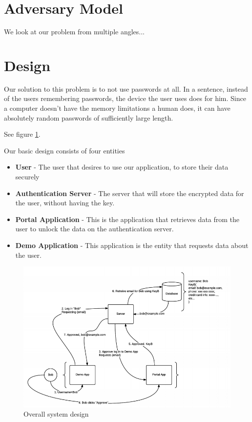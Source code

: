 \documentclass[letterpaper,twocolumn,10pt]{article}
\begin{document}
\section{Adversary Model}
    We look at our problem from multiple angles...




\section{Design}

Our solution to this problem is to not use passwords at all. In a sentence, instead of the users remembering passwords, the device the user uses does for him. Since a computer doesn't have the memory limitations a human does, it can have absolutely random passwords of sufficiently large length.

See figure \ref{design}.

Our basic design consists of four entities
\begin{itemize}
    \item \textbf{User} - The user that desires to use our application, to store their data securely
    \item \textbf{Authentication Server} - The server that will store the encrypted data for the user, without having the key.
    \item \textbf{Portal Application} - This is the application that retrieves data from the user to unlock the data on the authentication server.
    \item \textbf{Demo Application} - This application is the entity that requests data about the user.
\end{itemize}

\begin{figure}[ht]
\centering
\includegraphics[width=\textwidth]{Design}
\caption{Overall system design}
\label{design}
\end{figure}
\end{document}
